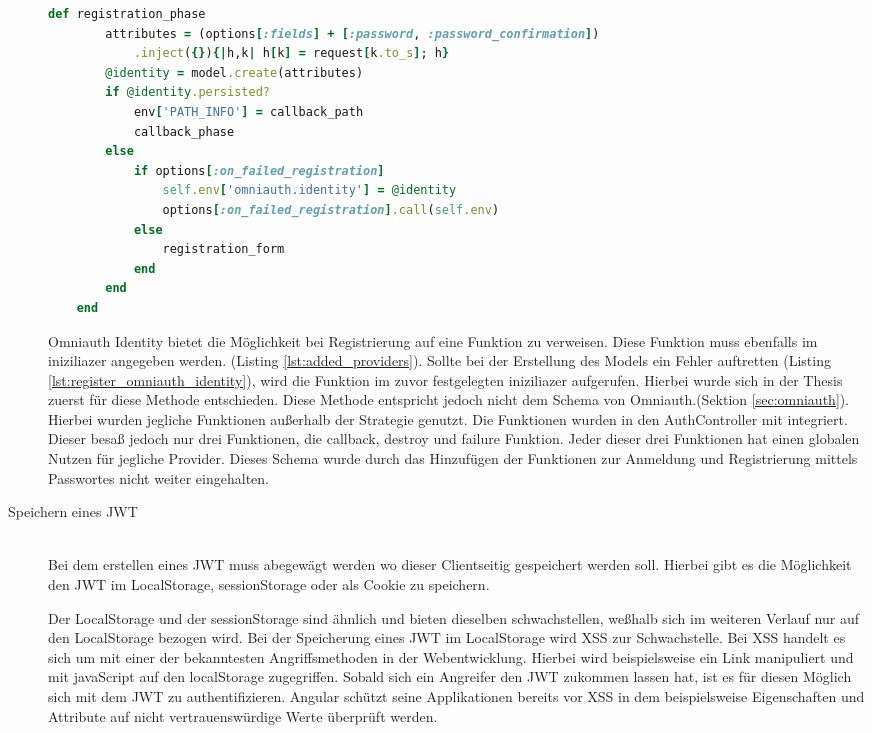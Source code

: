\documentclass[paper=a4,fontsize=12pt,parskip=half]{scrartcl}
\begin{document}
\begin{description}
		\begin{lstlisting}[language=Ruby, style=CodeView, caption=Aufgerufene Funktion bei POST Request (Omniauth Identity), captionpos=b, label={lst:register_omniauth_identity}]
	def registration_phase
		attributes = (options[:fields] + [:password, :password_confirmation])
			.inject({}){|h,k| h[k] = request[k.to_s]; h}
		@identity = model.create(attributes)
		if @identity.persisted?
			env['PATH_INFO'] = callback_path
			callback_phase
		else
			if options[:on_failed_registration]
				self.env['omniauth.identity'] = @identity
				options[:on_failed_registration].call(self.env)
			else
				registration_form
			end
		end
	end
		\end{lstlisting}
		Omniauth Identity bietet die Möglichkeit bei Registrierung auf eine Funktion zu verweisen. Diese Funktion muss ebenfalls im iniziliazer angegeben werden. (Listing \ref{lst:added_providers}). Sollte bei der Erstellung des Models ein Fehler auftretten (Listing \ref{lst:register_omniauth_identity}), wird die Funktion im zuvor festgelegten iniziliazer aufgerufen. Hierbei wurde sich in der Thesis zuerst für diese Methode entschieden. Diese Methode entspricht jedoch nicht dem Schema von Omniauth.(Sektion \ref{sec:omniauth}). Hierbei wurden jegliche Funktionen außerhalb der Strategie genutzt. Die Funktionen wurden in den AuthController mit integriert. Dieser besaß jedoch nur drei Funktionen, die callback, destroy und failure Funktion. Jeder dieser drei Funktionen hat einen globalen Nutzen für jegliche Provider. Dieses Schema wurde durch das Hinzufügen der Funktionen zur Anmeldung und Registrierung mittels Passwortes nicht weiter eingehalten. 

		\item[Speichern eines \gls{JWT}]\hfill\\
		Bei dem erstellen eines \gls{JWT} muss abegewägt werden wo dieser Clientseitig gespeichert werden soll. Hierbei gibt es die Möglichkeit den \gls{JWT} im LocalStorage, sessionStorage oder als Cookie zu speichern.
		
		Der LocalStorage und der sessionStorage sind ähnlich und bieten dieselben schwachstellen, weßhalb sich im weiteren Verlauf nur auf den LocalStorage bezogen wird. Bei der Speicherung eines \gls{JWT} im LocalStorage wird \gls{XSS} zur Schwachstelle. Bei \gls{XSS} handelt es sich um mit einer der bekanntesten Angriffsmethoden in der Webentwicklung. Hierbei wird beispielsweise ein Link manipuliert und mit javaScript auf den localStorage zugegriffen. Sobald sich ein Angreifer den \gls{JWT} zukommen lassen hat, ist es für diesen Möglich sich mit dem \gls{JWT} zu authentifizieren. Angular schützt seine Applikationen bereits vor \gls{XSS} in dem beispielsweise Eigenschaften und Attribute auf nicht vertrauenswürdige Werte überprüft werden.
		

\end{description}
\end{document}
